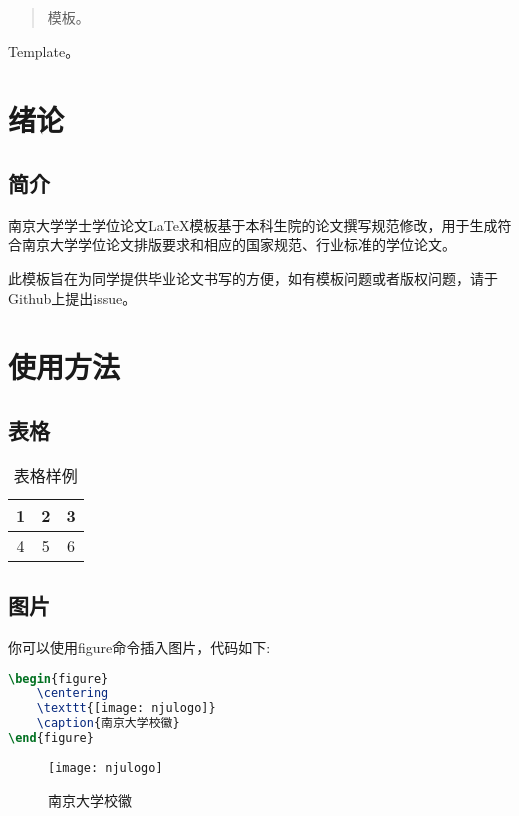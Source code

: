 \documentclass[
    TitleLength=1,%
]{njuthesis}
\begin{document}
\maketitle

\begin{abstract}
    模板。
\end{abstract}

\begin{englishabstract}
    Template。
\end{englishabstract}

\tableofcontents

\mainmatter

\chapter{绪论}
    \section{简介}
    南京大学学士学位论文\LaTeX 模板\cite{njuthesis}基于本科生院的论文撰写规范修改，用于生成符合南京大学学位论文排版要求和相应的国家规范、行业标准的学位论文。

    此模板旨在为同学提供毕业论文书写的方便，如有模板问题或者版权问题，请于Github上提出issue。
\chapter{使用方法}
    \section{表格}
    \begin{table}[htbp]
        \centering
        \caption{表格样例}
        \begin{tabular}{|c|c|c|}
            \hline
            1 & 2 & 3 \\
            \hline
            4 &  5 & 6 \\
            \hline
        \end{tabular}
    \end{table}
    \section{图片}
    你可以使用figure命令插入图片，代码如下:
    \begin{lstlisting}[language=TeX]
\begin{figure}
    \centering
    \texttt{[image: njulogo]}
    \caption{南京大学校徽}
\end{figure}
    \end{lstlisting}
    \begin{figure}[htbp]
        \centering
        \texttt{[image: njulogo]}
        \caption{南京大学校徽}
    \end{figure}

\printbibliography
\end{document}
